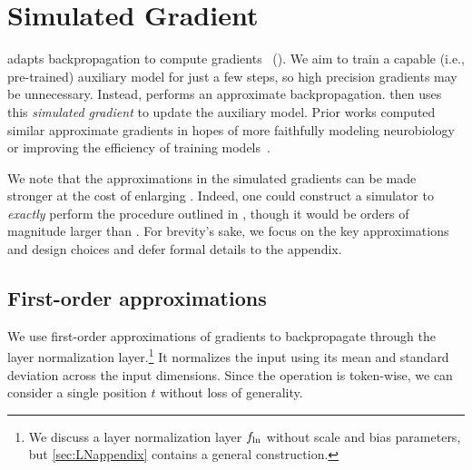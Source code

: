 \section{Simulated Gradient} \label{sec:modification}
\simulator{} adapts backpropagation to compute gradients 
~().
We aim to train a capable (i.e., pre-trained) auxiliary model for just a few steps, so high precision gradients may be unnecessary. Instead, \simulator{} performs an approximate backpropagation.  
\simulator{} then uses this \emph{simulated gradient} to update the auxiliary model.
Prior works computed similar approximate gradients in hopes of more faithfully modeling neurobiology~\citep{scellier2017equilibrium,hinton2022forwardforward} or improving the efficiency of training models~\citep{hu2021lora,malladi2023finetuning}.

We note that the approximations in the simulated gradients can be made stronger at the cost of enlarging \simulator{}.
Indeed, one could construct a simulator to \emph{exactly} perform the procedure outlined in \textsection{\ref{sec:design}}, though it would be orders of magnitude larger than \simulator{}.
For brevity's sake, we focus on the key approximations and design choices and defer formal details to the appendix.

\subsection{First-order approximations} \label{sec:first_order_approx}
We use first-order approximations of gradients to backpropagate through 
the layer normalization layer.\footnote{We discuss a layer normalization layer $f_{\text{ln}}$ without scale and bias parameters, but \cref{sec:LNappendix} contains a general construction.} 
It normalizes the input using its mean and standard deviation across the input dimensions. Since the operation is token-wise, we can consider a single position $t$ without loss of generality.

